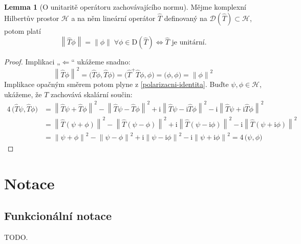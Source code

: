 \documentclass[10pt,a4paper]{report}
\theoremstyle{definition}
\newtheorem{lemma}[theorem]{Lemma}
\newcommand{\const}[1]{\mathrm{#1}}
\newcommand{\norm}[1]{\left\lVert#1\right\rVert}
\newcommand{\innerprod}[2]{\big( #1, #2 \big)}
\newcommand{\I}{\const{i}}
\def\H{\mathcal{H}}
\def\domain{\mathcal{D}}
\begin{document}
\begin{lemma}[O unitaritě operátoru zachovávajícího normu]
    \label{unitarni-zachova-normu}
    Mějme komplexní Hilbertův prostor $\H$ a na něm lineární operátor $\hat T$ definovaný na $\domain(\hat T) \subset \H$, potom platí
    \begin{equation*}
        \norm{\hat T \phi} = \norm{\phi}
        \;\forall \phi \in \mathrm{D}(\hat T)
        \iff
        \hat T \text{ je unitární.}
    \end{equation*}
\end{lemma}
\begin{proof}
    Implikaci „$\Leftarrow$“ ukážeme snadno:
    \begin{equation*}
        \norm{\hat T \phi}^2
        = \innerprod{\hat T \phi}{\hat T \phi}
        = \innerprod{\hat T^+ \hat T \phi}{\phi}
        = \innerprod{\phi}{\phi}
        = \norm{\phi}^2
    \end{equation*}
    Implikace opačným směrem potom plyne z \ref{polarizacni-identita}. Buďte $\psi, \phi \in \H$, ukážeme, že $T$ zachovává skalární součin:
    \begin{align*}
        4 \, \innerprod{\hat T \psi}{\hat T \phi}
        &= \norm{\hat T \psi + \hat T \phi}^2
        - \norm{\hat T \psi - \hat T \phi}^2
        + \I \norm{\hat T \psi - \I \hat T \phi}^2
        - \I \norm{\hat T \psi + \I \hat T \phi}^2
        \\[10pt]
        &= \norm{\hat T(\psi + \phi)}^2
        - \norm{\hat T(\psi - \phi)}^2
        + \I \norm{\hat T(\psi - \I \phi)}^2
        - \I \norm{\hat T(\psi + \I \phi)}^2
        \\[10pt]
        &= \norm{\psi + \phi}^2
        - \norm{\psi - \phi}^2
        + \I \norm{\psi - \I \phi}^2
        - \I \norm{\psi + \I \phi}^2
        = 4 \, \innerprod{\psi}{\phi}
    \end{align*}
\end{proof}


\section{Notace}
\subsection{Funkcionální notace}
TODO.
\end{document}

